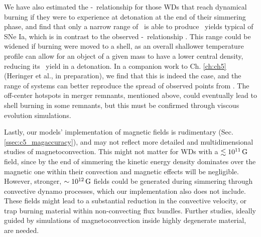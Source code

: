 We have also estimated the \Mtot-\MNi\ relationship for those WDs that reach dynamical burning if they were to experience at detonation at the end of their simmering phase, and find that only a narrow range of \Mtot\ is able to produce \MNi\ yields typical of SNe Ia, which is in contrast to the observed \Mtot-\MNi\ relationship \citep{scalzrs14, chil+15}.  This range could be widened if burning were moved to a shell, as an overall shallower temperature profile can allow for an object of a given mass to have a lower central density, reducing its \Ni\ yield in a detonation.  In a companion work to Ch. \ref{ch:ch5} (Heringer et al., in preparation), we find that this is indeed the case, and the range of systems can better reproduce the spread of observed points from \cite{chil+15}.  The off-center hotspots in merger remnants, mentioned above, could eventually lead to shell burning in some remnants, but this must be confirmed through viscous evolution simulations.

Lastly, our models' implementation of magnetic fields is rudimentary (Sec. \ref{ssec:c5_magaccuracy}), and may not reflect more detailed and multidimensional studies of magnetoconvection.  This might not matter for WDs with a $\lesssim 10^{11}\,\mathrm{G}$ field, since by the end of simmering the kinetic energy density dominates over the magnetic one within their convection and magnetic effects will be negligible.  However, stronger, $\sim10^{12}\,\mathrm{G}$ fields could be generated during simmering through convective dynamo processes, which our implementation also does not include.  These fields might lead to a substantial reduction in the convective velocity, or trap burning material within non-convecting flux bundles.  Further studies, ideally guided by simulations of magnetoconvection inside highly degenerate material, are needed.


